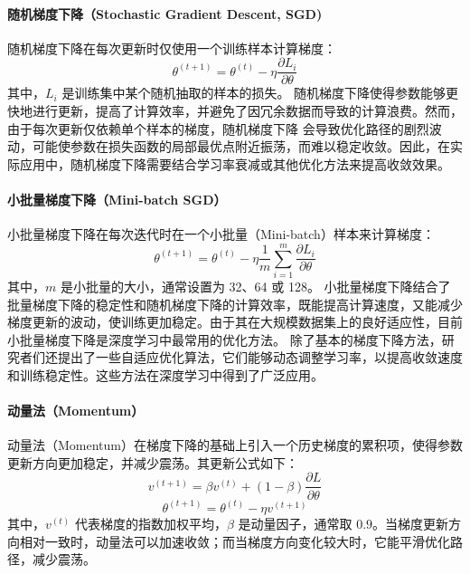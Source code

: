 \paragraph*{随机梯度下降（Stochastic Gradient Descent, SGD)}
随机梯度下降在每次更新时仅使用一个训练样本计算梯度：
\begin{equation}
\theta^{(t+1)} = \theta^{(t)} - \eta \frac{\partial L_i}{\partial \theta}
\end{equation}
其中，\( L_i \) 是训练集中某个随机抽取的样本的损失。
随机梯度下降使得参数能够更快地进行更新，提高了计算效率，并避免了因冗余数据而导致的计算浪费。然而，由于每次更新仅依赖单个样本的梯度，随机梯度下降 会导致优化路径的剧烈波动，可能使参数在损失函数的局部最优点附近振荡，而难以稳定收敛。因此，在实际应用中，随机梯度下降需要结合学习率衰减或其他优化方法来提高收敛效果。
\paragraph*{小批量梯度下降（Mini-batch SGD）}
小批量梯度下降在每次迭代时在一个小批量（Mini-batch）样本来计算梯度：
\begin{equation}
\theta^{(t+1)} = \theta^{(t)} - \eta \frac{1}{m} \sum_{i=1}^{m} \frac{\partial L_i}{\partial \theta}
\end{equation}
其中，\(m\) 是小批量的大小，通常设置为 32、64 或 128。
小批量梯度下降结合了批量梯度下降的稳定性和随机梯度下降的计算效率，既能提高计算速度，又能减少梯度更新的波动，使训练更加稳定。由于其在大规模数据集上的良好适应性，目前小批量梯度下降是深度学习中最常用的优化方法。
除了基本的梯度下降方法，研究者们还提出了一些自适应优化算法，它们能够动态调整学习率，以提高收敛速度和训练稳定性。这些方法在深度学习中得到了广泛应用。
\paragraph*{动量法（Momentum）}
动量法（Momentum）在梯度下降的基础上引入一个历史梯度的累积项，使得参数更新方向更加稳定，并减少震荡。其更新公式如下：
\begin{equation}
v^{(t+1)} = \beta v^{(t)} + (1-\beta) \frac{\partial L}{\partial \theta}
\end{equation}
\begin{equation}
\theta^{(t+1)} = \theta^{(t)} - \eta v^{(t+1)}
\end{equation}
其中，\( v^{(t)} \) 代表梯度的指数加权平均，\( \beta \) 是动量因子，通常取 \( 0.9 \)。当梯度更新方向相对一致时，动量法可以加速收敛；而当梯度方向变化较大时，它能平滑优化路径，减少震荡。
